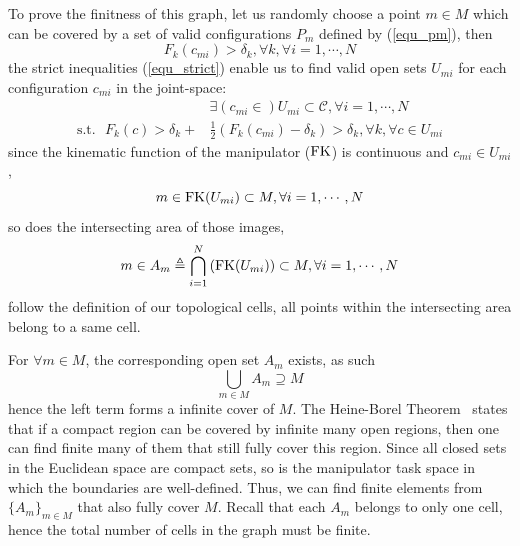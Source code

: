 \documentclass[journal]{IEEEtran}
\begin{document}
To prove the finitness of this graph, let us randomly choose a point $m\in M$ which can be covered by a set of valid 
configurations $P_m$ defined by (\ref{equ_pm}), then 
\begin{equation}
F_k(c_{mi}) > \delta_{k}, \forall k, \forall i = 1, \cdots, N
\end{equation}
the strict inequalities (\ref{equ_strict}) enable us to find valid open sets $U_{mi}$ for each configuration $c_{mi}$ in the joint-space:
\begin{equation}
\begin{aligned}
&\exists (c_{mi}\in )U_{mi} \subset \mathscr{C}, \forall i = 1, \cdots, N \\
\mbox{s.t.}\mbox{  } F_k(c) > \delta_k + &\frac{1}{2}(F_k(c_{mi}) - \delta_k)> \delta_k, \forall k, \forall c\in U_{mi}
\end{aligned}
\end{equation}
since the kinematic function of the manipulator (${\rm FK}$) is continuous and $c_{mi}\in U_{mi}$, 
\begin{equation}
m\in {\rm FK}(U_{mi})\subset M, \forall i = 1, \cdots, N
\end{equation}
so does the intersecting area of those images, 
\begin{equation}
m\in A_m \triangleq\bigcap\limits_{i = 1}^N\left({\rm FK} (U_{mi})\right)\subset M, \forall i = 1, \cdots, N
\end{equation}
follow the definition of our topological cells, all points within the intersecting area belong to a same cell. 

For $\forall m\in M$, the corresponding open set $A_m$ exists, as such %
\begin{equation}
\bigcup\limits_{m\in M}A_m\supseteq M
\end{equation}
hence the left term forms a infinite cover of $M$. %
The Heine-Borel Theorem~\cite{Simmons1964Introduction} states that if a compact region can be covered by infinite many open regions, then one can find finite many of them that still fully cover this region. Since all closed sets in the Euclidean space are compact sets, so is the manipulator 
task space in which the boundaries are well-defined. Thus, we can find finite elements from $\{A_m\}_{m\in M}$ that also fully 
cover $M$. Recall that each $A_m$ belongs to only one cell, hence the total number of cells in the graph must be finite.  
\end{document}
